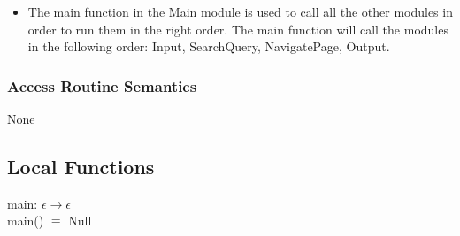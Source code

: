 \documentclass{article}
\begin{document}
\begin{itemize}
    \item The main function in the Main module is used to call all the other modules in order to run them in the right order. The main function will call the modules in the following order: Input, SearchQuery, NavigatePage, Output.
\end{itemize}

\subsubsection* {Access Routine Semantics}

None

\subsection* {Local Functions}

\noindent main: $\epsilon \rightarrow \epsilon$  \\
main() $\equiv$ Null\\
\end{document}
